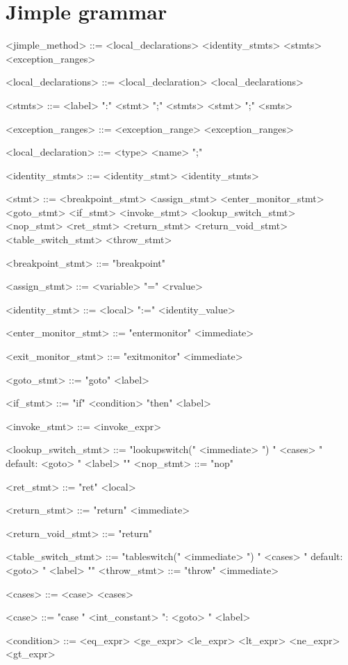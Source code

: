 \documentclass{report}
\begin{document}
\section{Jimple grammar}
\begin{grammar}
<jimple_method> ::= <local_declarations> <identity_stmts> <stmts> <exception_ranges>

<local_declarations> ::= <local_declaration> <local_declarations>

<stmts> ::= <label> ":" <stmt> ";" <stmts> \alt  <stmt> ";" <smts>

<exception_ranges> ::= <exception_range> <exception_ranges>

<local_declaration> ::= <type> <name> ";"

<identity_stmts> ::= <identity_stmt> <identity_stmts>

<stmt> ::= <breakpoint_stmt> \alt <assign_stmt> \alt <enter_monitor_stmt>
<goto_stmt> \alt <if_stmt> \alt <invoke_stmt> \alt <lookup_switch_stmt> \alt <nop_stmt> \alt <ret_stmt> \alt <return_stmt> \alt <return_void_stmt> \alt <table_switch_stmt> \alt <throw_stmt>

<breakpoint_stmt> ::= "breakpoint"

<assign_stmt> ::= <variable> "=" <rvalue>

<identity_stmt> ::= <local> ":=" <identity_value>

<enter_monitor_stmt> ::= "entermonitor" <immediate>

<exit_monitor_stmt> ::= "exitmonitor" <immediate>

<goto_stmt> ::= "goto" <label>

<if_stmt> ::= "if" <condition> "then" <label>

<invoke_stmt> ::= <invoke_expr>

<lookup_switch_stmt> ::= "lookupswitch(" <immediate> ") {" <cases> " default: <goto> " <label> "}" <nop_stmt> ::= "nop"

<ret_stmt> ::= "ret" <local>

<return_stmt> ::= "return" <immediate>

<return_void_stmt> ::= "return" 

<table_switch_stmt> ::= "tableswitch(" <immediate> ") {" <cases> " default: <goto> " <label> "}" <throw_stmt> ::= "throw" <immediate>

<cases> ::= <case> <cases>

<case> ::= "case " <int_constant> ": <goto> " <label>

<condition> ::= <eq_expr> \alt <ge_expr> \alt <le_expr> \alt <lt_expr> \alt <ne_expr> \alt <gt_expr>


\end{grammar}
\end{document}
